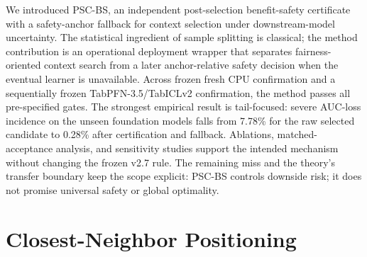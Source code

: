 \documentclass[10pt]{article}
\newcommand{\PSC}{\textsc{PSC-BS}}
\begin{document}
We introduced \PSC{}, an independent post-selection benefit-safety certificate with a safety-anchor fallback for context selection under downstream-model uncertainty.
The statistical ingredient of sample splitting is classical; the method contribution is an operational deployment wrapper that separates fairness-oriented context search from a later anchor-relative safety decision when the eventual learner is unavailable.
Across frozen fresh CPU confirmation and a sequentially frozen TabPFN-3.5/TabICLv2 confirmation, the method passes all pre-specified gates.
The strongest empirical result is tail-focused: severe AUC-loss incidence on the unseen foundation models falls from 7.78\% for the raw selected candidate to 0.28\% after certification and fallback.
Ablations, matched-acceptance analysis, and sensitivity studies support the intended mechanism without changing the frozen v2.7 rule.
The remaining miss and the theory's transfer boundary keep the scope explicit: \PSC{} controls downside risk; it does not promise universal safety or global optimality.

\appendix
\section{Closest-Neighbor Positioning}
\end{document}
